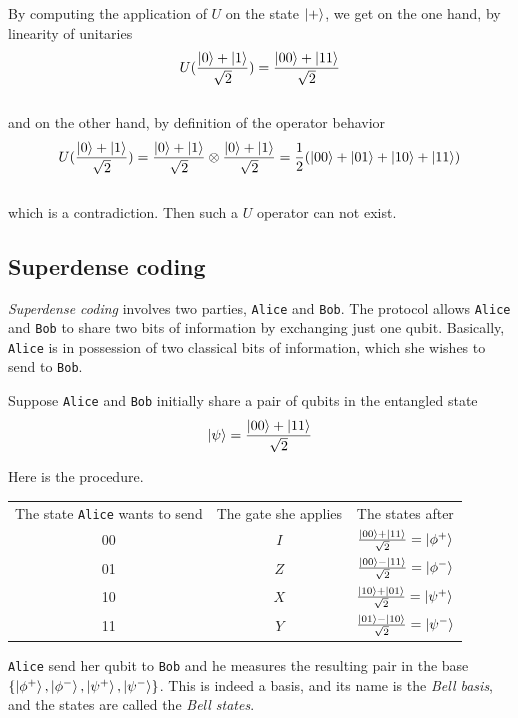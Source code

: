 \documentclass{article}
\begin{document}
By computing the application of $U$ on the state $\ket{+}$, we get on the one hand, by linearity of unitaries
\begin{equation}
    U(\frac{\ket{0}+\ket{1}}{\sqrt{2}}) = \frac{\ket{00}+\ket{11}}{\sqrt{2}}
\end{equation}
\\
and on the other hand, by definition of the operator behavior
\begin{equation}
    U(\frac{\ket{0}+\ket{1}}{\sqrt{2}}) = \frac{\ket{0}+\ket{1}}{\sqrt{2}} \otimes \frac{\ket{0}+\ket{1}}{\sqrt{2}}
    =\frac{1}{2}(\ket{00}+\ket{01}+\ket{10}+\ket{11})
\end{equation}
\\
which is a contradiction. Then such a $U$ operator can not exist.

\subsection{Superdense coding}
\textit{Superdense coding} involves two parties, \texttt{Alice} and \texttt{Bob}.
The protocol allows \texttt{Alice} and \texttt{Bob} to share two bits of information by exchanging just one qubit.
Basically, \texttt{Alice} is in possession of two classical bits of information, which she wishes to send to \texttt{Bob}.

Suppose \texttt{Alice} and \texttt{Bob} initially share a pair of qubits in the entangled state
\begin{equation}
    \ket{\psi} = \frac{\ket{00} + \ket{11}}{\sqrt{2}}
\end{equation}

Here is the procedure.

\begin{table}[h]
    \centering
    \begin{tabular}{c|c|c}
    The state \texttt{Alice} wants to send & The gate she applies & The states after \\
    00 & $I$ & $\frac{\ket{00} + \ket{11}}{\sqrt{2}} = \ket{\phi^+}$  \\
    01 & $Z$ & $\frac{\ket{00} - \ket{11}}{\sqrt{2}} = \ket{\phi^-}$ \\
    10 & $X$ & $\frac{\ket{10} + \ket{01}}{\sqrt{2}} = \ket{\psi^+}$ \\
    11 & $Y$ & $\frac{\ket{01} - \ket{10}}{\sqrt{2}} = \ket{\psi^-}$
    \end{tabular}
\end{table}

\texttt{Alice} send her qubit to \texttt{Bob} and he measures the resulting pair in the base \\
$\{\ket{\phi^+}, \ket{\phi^-},\ket{\psi^+}, \ket{\psi^-}\}$. This is indeed a basis, and its name is the \textit{Bell basis},
and the states are called the \textit{Bell states}.
\end{document}
